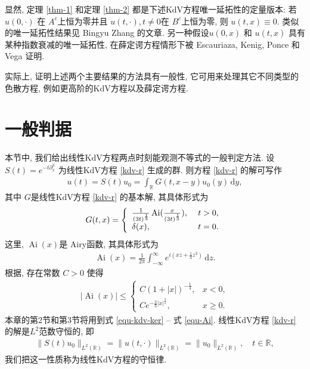 \documentclass[master]{cugthesis}
\newcommand\R{\ensuremath{\mathbb{R}}}
\renewcommand\d{\ensuremath{\,\mathrm{d}}}
\begin{document}
    显然, 定理 \ref{thm-1} 和定理 \ref{thm-2} 都是下述KdV方程唯一延拓性的定量版本: 若 $u(0,\cdot)$ 在 $A^c$上恒为零并且 $u(t,\cdot),t\neq 0$在 $B^c$上恒为零, 则 $u(t,x)\equiv 0$. 类似的唯一延拓性结果见 Bingyu Zhang 的文章\cite{Zhang1992UniqueCF,Zhang1997Unique}. 另一种假设$u(0,x)$ 和 $u(t,x)$ 具有某种指数衰减的唯一延拓性, 在薛定谔方程情形下被 Escauriaza, Kenig, Ponce 和 Vega \cite{Escauriaza2007OnUP}证明.
    
    实际上, 证明上述两个主要结果的方法具有一般性, 它可用来处理其它不同类型的色散方程, 例如更高阶的KdV方程以及薛定谔方程. 

    \section{一般判据}
    本节中, 我们给出线性KdV方程两点时刻能观测不等式的一般判定方法. 
    设$S(t)=e^{-t\partial^3_x}$ 为线性KdV方程 \eqref{kdv-r} 生成的群. 则方程 \eqref{kdv-r} 的解可写作
    \begin{align}\label{equ-kdv-solu}
    u(t)=S(t)u_0=\int_\R G(t,x-y)u_0(y)\d y,
    \end{align}
    其中 $G$是线性KdV方程 \eqref{kdv-r} 的基本解, 其具体形式为
    \begin{align}\label{equ-kdv-ker}
    G(t,x)= \left\{
        \begin{array}{ll}
        \frac{1}{(3t)^{\frac{1}{3}}}\operatorname{Ai}(\frac{x}{(3t)^{\frac{1}{3}}}), & \hbox{ }t> 0, \\
        \delta(x), & \hbox{ }t=0.
        \end{array}
        \right.
    \end{align}
    这里, $\operatorname{Ai}(x)$是 Airy函数, 其具体形式为
    \begin{align*}
    \operatorname{Ai}(x)= \frac{1}{2\pi}\int^{\infty}_{-\infty}e^{i(xz+\frac{1}{3}z^3)}\d z.
    \end{align*}
    根据\cite[p.~330]{SteinShakarchi2010}, 存在常数 $C>0$ 使得
    \begin{align}\label{equ-Ai}
|\operatorname{Ai}(x)| \leq
\left\{
\begin{array}{ll}
C(1+|x|)^{-\frac{1}{4}}, &   x<0, \\
 Ce^{-\frac{2}{3}|x|^{\frac{3}{2}}}, &  x\geq 0.
\end{array}
\right.
\end{align}
本章的第2节和第3节将用到式 \eqref{equ-kdv-ker} -- 式 \eqref{equ-Ai}. 线性KdV方程 \eqref{kdv-r} 的解是$L^2$范数守恒的, 即 
\begin{align}\label{equ-conservation-law}
\|S(t)u_0\|_{L^2(\R)}=\|u(t,\cdot)\|_{L^2(\R)}=\|u_0\|_{L^2(\R)}, \quad t\in \R,
\end{align}
我们把这一性质称为线性KdV方程的守恒律.
\end{document}
